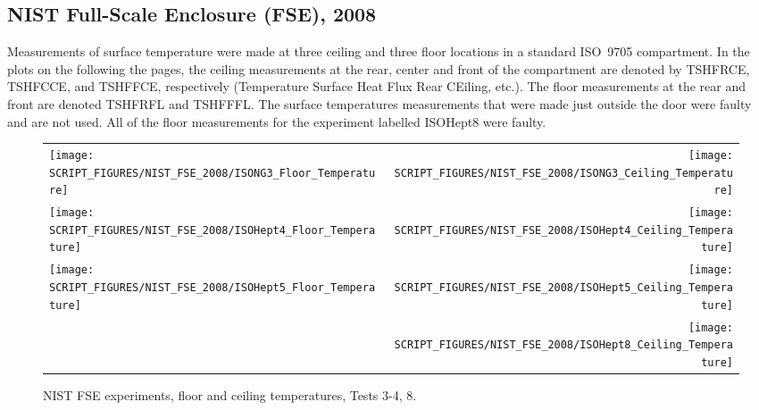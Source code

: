 \clearpage

\subsection{NIST Full-Scale Enclosure (FSE), 2008}

Measurements of surface temperature were made at three ceiling and three floor locations in a standard ISO~9705 compartment. In the plots on the following the pages, the ceiling measurements at the rear, center and front of the compartment are denoted by TSHFRCE, TSHFCCE, and TSHFFCE, respectively (Temperature Surface Heat Flux Rear CEiling, etc.). The floor measurements at the rear and front are denoted TSHFRFL and TSHFFFL. The surface temperatures measurements that were made just outside the door were faulty and are not used. All of the floor measurements for the experiment labelled ISOHept8 were faulty.

\newpage

\begin{figure}[p]
\begin{tabular*}{\textwidth}{l@{\extracolsep{\fill}}r}
\texttt{[image: SCRIPT\_FIGURES/NIST\_FSE\_2008/ISONG3\_Floor\_Temperature]} &
\texttt{[image: SCRIPT\_FIGURES/NIST\_FSE\_2008/ISONG3\_Ceiling\_Temperature]} \\
\texttt{[image: SCRIPT\_FIGURES/NIST\_FSE\_2008/ISOHept4\_Floor\_Temperature]} &
\texttt{[image: SCRIPT\_FIGURES/NIST\_FSE\_2008/ISOHept4\_Ceiling\_Temperature]} \\
\texttt{[image: SCRIPT\_FIGURES/NIST\_FSE\_2008/ISOHept5\_Floor\_Temperature]} &
\texttt{[image: SCRIPT\_FIGURES/NIST\_FSE\_2008/ISOHept5\_Ceiling\_Temperature]} \\
 &
\texttt{[image: SCRIPT\_FIGURES/NIST\_FSE\_2008/ISOHept8\_Ceiling\_Temperature]}
\end{tabular*}
\caption{NIST FSE experiments, floor and ceiling temperatures, Tests 3-4, 8.}
\label{NIST_FSE_2008_Surface_Temp_1}
\end{figure}


